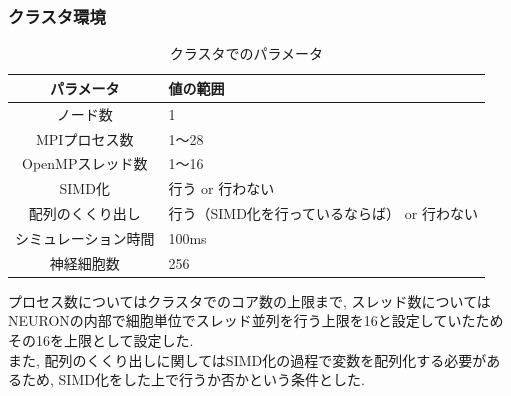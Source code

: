 \subsubsection{クラスタ環境}
\begin{table}[htb]
  \caption {クラスタでのパラメータ}
  \begin{center}
    \begin{tabular}{|c|p{12cm}|}
      \hline
      パラメータ & 値の範囲\\ \hline
      ノード数 & 1\\ \hline
      MPIプロセス数 & 1〜28\\ \hline
      OpenMPスレッド数 & 1〜16\\ \hline
      SIMD化 & 行う or 行わない\\ \hline
      配列のくくり出し & 行う（SIMD化を行っているならば） or 行わない\\ \hline
      シミュレーション時間 & 100ms\\ \hline
      神経細胞数 & 256\\ \hline
    \end{tabular}
  \end{center}
\end{table}
プロセス数についてはクラスタでのコア数の上限まで,
スレッド数についてはNEURONの内部で細胞単位でスレッド並列を行う上限を16と設定していたためその16を上限として設定した.\\
また, 配列のくくり出しに関してはSIMD化の過程で変数を配列化する必要があるため, SIMD化をした上で行うか否かという条件とした.\\

